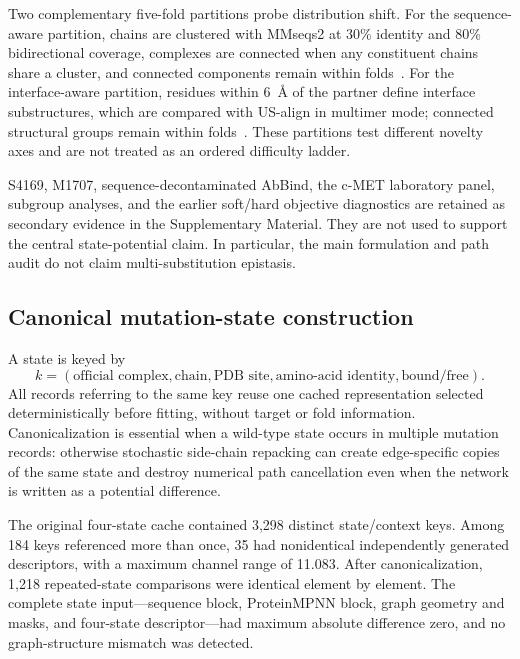\documentclass[preprint,12pt]{elsarticle}
\begin{document}
Two complementary five-fold partitions probe distribution shift. For the sequence-aware partition, chains are clustered with MMseqs2 at 30\% identity and 80\% bidirectional coverage, complexes are connected when any constituent chains share a cluster, and connected components remain within folds~\cite{mmseqs2}. For the interface-aware partition, residues within 6~\AA{} of the partner define interface substructures, which are compared with US-align in multimer mode; connected structural groups remain within folds~\cite{usalign}. These partitions test different novelty axes and are not treated as an ordered difficulty ladder.

S4169, M1707, sequence-decontaminated AbBind, the c-MET laboratory panel, subgroup analyses, and the earlier soft/hard objective diagnostics are retained as secondary evidence in the Supplementary Material. They are not used to support the central state-potential claim. In particular, the main formulation and path audit do not claim multi-substitution epistasis.

\subsection{Canonical mutation-state construction}

A state is keyed by
\begin{equation}
  k=(\text{official complex},\text{chain},\text{PDB site},
  \text{amino-acid identity},\text{bound/free}).
  \label{eq:canonical_key}
\end{equation}
All records referring to the same key reuse one cached representation selected deterministically before fitting, without target or fold information. Canonicalization is essential when a wild-type state occurs in multiple mutation records: otherwise stochastic side-chain repacking can create edge-specific copies of the same state and destroy numerical path cancellation even when the network is written as a potential difference.

The original four-state cache contained 3,298 distinct state/context keys. Among 184 keys referenced more than once, 35 had nonidentical independently generated descriptors, with a maximum channel range of 11.083. After canonicalization, 1,218 repeated-state comparisons were identical element by element. The complete state input---sequence block, ProteinMPNN block, graph geometry and masks, and four-state descriptor---had maximum absolute difference zero, and no graph-structure mismatch was detected.
\end{document}
